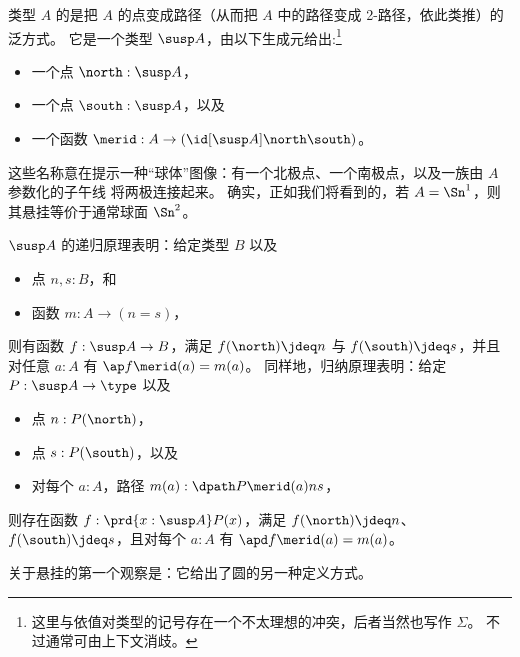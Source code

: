 %
%
类型 $A$ 的是把 $A$ 的点变成路径（从而把 $A$ 中的路径变成 2-路径，依此类推）的泛方式。
它是一个类型 $\susp A$，由以下生成元给出:\footnote{这里与依值对类型的记号存在一个不太理想的冲突，后者当然也写作 $\Sigma$。
  不过通常可由上下文消歧。}
\begin{itemize}
\item 一个点 $\north:\susp A$，
\item 一个点 $\south:\susp A$，以及
\item 一个函数 $\merid:A \to (\id[\susp A]\north\south)$。
\end{itemize}
这些名称意在提示一种“球体”图像：有一个北极点、一个南极点，以及一族由 $A$ 参数化的子午线
%
%
将两极连接起来。
确实，正如我们将看到的，若 $A=\Sn^1$，则其悬挂等价于通常球面 $\Sn^2$。

%
$\susp A$ 的递归原理表明：给定类型 $B$ 以及
\begin{itemize}
\item 点 $n,s:B$，和
\item 函数 $m:A \to (n=s)$，
\end{itemize}
则有函数 $f:\susp A \to B$，满足 $f(\north)\jdeq n$ 与 $f(\south)\jdeq s$，并且对任意 $a:A$ 有 $\ap f {\merid(a)} = m(a)$。
%
同样地，归纳原理表明：给定 $P:\susp A \to \type$ 以及
\begin{itemize}
\item 点 $n:P(\north)$，
\item 点 $s:P(\south)$，以及
\item 对每个 $a:A$，路径 $m(a):\dpath P{\merid(a)}ns$，
\end{itemize}
则存在函数 $f:\prd{x:\susp A} P(x)$，满足 $f(\north)\jdeq n$、$f(\south)\jdeq s$，且对每个 $a:A$ 有 $\apd f {\merid(a)} = m(a)$。

关于悬挂的第一个观察是：它给出了圆的另一种定义方式。

